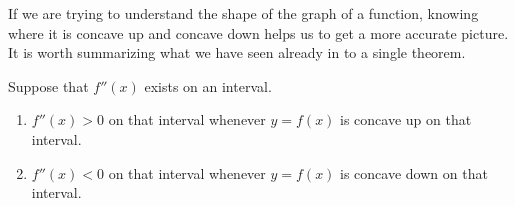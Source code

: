 \documentclass{ximera}
\begin{document}
If we are trying to understand the shape of the graph of a function,
knowing where it is concave up and concave down helps us to get a more
accurate picture. It is worth summarizing what we have seen already in
to a single theorem.

\begin{theorem}
Suppose that $f''(x)$ exists on an interval.
\begin{enumerate}
\item $f''(x)>0$ on that interval whenever $y=f(x)$ is concave up on that interval.
\item $f''(x)<0$ on that interval whenever $y=f(x)$ is concave down on that interval.
\end{enumerate}
\end{theorem}
\end{document}
